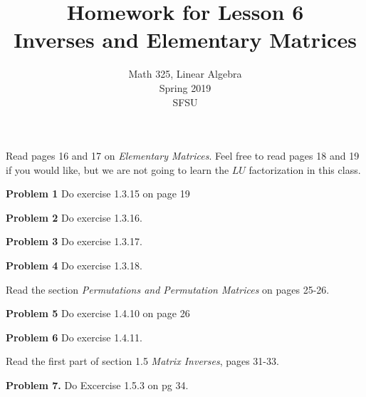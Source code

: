\documentclass[oneside,12pt]{amsart}
\begin{document}
\title{Homework for Lesson 6 \\ Inverses and Elementary Matrices}
\author{Math 325, Linear Algebra \\ Spring 2019 \\ SFSU }
\date{}

\maketitle

\bigskip

Read pages 16 and 17 on \emph{Elementary Matrices}. Feel free to read pages
18 and 19 if you would like, but we are not going to learn the $LU$
factorization in this class.

\textbf{Problem 1} Do exercise 1.3.15 on page 19

\bigskip
\bigskip
\bigskip
\bigskip
\bigskip
\bigskip
\bigskip
\bigskip
\bigskip
\bigskip

\textbf{Problem 2} Do exercise 1.3.16.


\bigskip
\bigskip
\bigskip
\bigskip
\bigskip
\bigskip
\bigskip
\bigskip
\bigskip
\bigskip

\textbf{Problem 3} Do exercise 1.3.17.

\bigskip
\bigskip
\bigskip
\bigskip
\bigskip
\bigskip
\bigskip
\bigskip
\bigskip
\bigskip

\textbf{Problem 4} Do exercise 1.3.18.

\bigskip
\bigskip
\bigskip
\bigskip
\bigskip
\bigskip
\bigskip
\bigskip
\bigskip
\bigskip

Read the section \emph{Permutations and Permutation Matrices} on pages 25-26.

\medskip

\textbf{Problem 5} Do exercise 1.4.10 on page 26

\bigskip
\bigskip
\bigskip
\bigskip
\bigskip
\bigskip
\bigskip
\bigskip
\bigskip
\bigskip

\textbf{Problem 6} Do exercise 1.4.11.


\bigskip
\bigskip
\bigskip
\bigskip
\bigskip
\bigskip
\bigskip
\bigskip
\bigskip
\bigskip


Read the first part of section 1.5 \emph{Matrix Inverses}, pages 31-33.

\medskip

\textbf{Problem 7.} Do Excercise 1.5.3 on pg 34.

\bigskip
\bigskip
\bigskip
\bigskip
\bigskip
\bigskip
\bigskip
\bigskip
\bigskip
\bigskip
\end{document}
